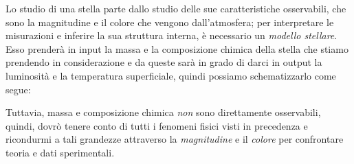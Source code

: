 Lo studio di una stella parte dallo studio delle sue caratteristiche osservabili, che sono la magnitudine e il colore che vengono dall'atmosfera; per interpretare le misurazioni e inferire la sua struttura interna, è necessario un \emph{modello stellare}. Esso prenderà in input la massa e la composizione chimica della stella che stiamo prendendo in considerazione e da queste sarà in grado di darci in output la luminosità e la temperatura superficiale, quindi possiamo schematizzarlo come segue:
\begin{center}
\end{center}

Tuttavia, massa e composizione chimica \emph{non} sono direttamente osservabili, quindi, dovrò tenere conto di tutti i fenomeni fisici visti in precedenza e ricondurmi a tali grandezze attraverso la \emph{magnitudine} e il \emph{colore} per confrontare teoria e dati sperimentali. 

